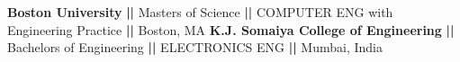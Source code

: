 %
%
%


\begin{scholarship}
					{\textbf{Boston University} \textbf{||} Masters of Science \textbf{||} COMPUTER ENG with Engineering Practice \textbf{||} 
					Boston, MA} 
					{\textbf{K.J. Somaiya College of Engineering} \textbf{||} Bachelors of Engineering \textbf{||} ELECTRONICS ENG \textbf{||}
					Mumbai, India}
\end{scholarship}
